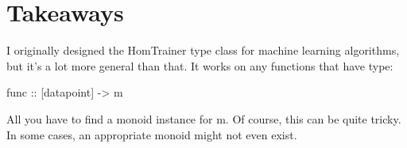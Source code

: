 \documentclass[tikz]{tmr}
\newcommand\+{\mdoubleplus}
\begin{document}
\section{Takeaways}

I originally designed the HomTrainer type class for machine learning algorithms, but it's a lot more general than that.
It works on any functions that have type:
\begin{spec}
func :: [datapoint] -> m
\end{spec}
All you have to find a monoid instance for m.
Of course, this can be quite tricky.
In some cases, an appropriate monoid might not even exist.
\end{document}
